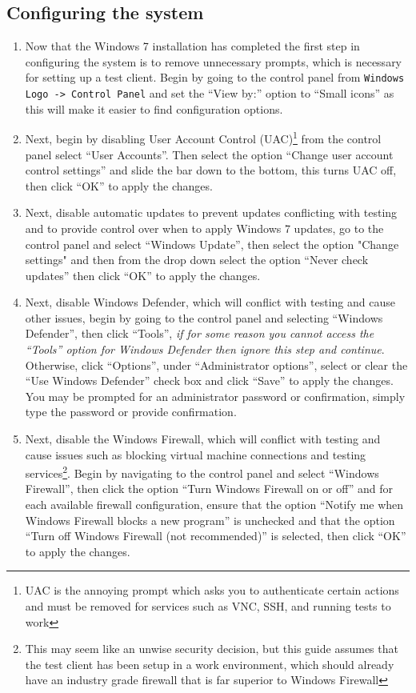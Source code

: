 \newpage
\subsection{Configuring the system}
\label{sec:windows7config}
\begin{enumerate}
\item	Now that the Windows 7 installation has completed the first step in configuring the system is to remove unnecessary prompts,
		which is necessary for setting up a test client. Begin by going to the control panel from \verb|Windows Logo -> Control Panel|
		and set the ``View by:'' option to ``Small icons'' as this will make it easier to find configuration options.
		
\item	Next, begin by disabling User Account Control (UAC)\footnote{UAC is the annoying prompt which asks you to authenticate certain
		actions and must be removed for services such as VNC, SSH, and running tests to work} from the control panel select ``User Accounts''.
		Then select the option ``Change user account control settings'' and slide the bar down to the bottom, this turns UAC off, then click
		``OK'' to apply the changes.
		
\item	Next, disable automatic updates to prevent updates conflicting with testing and to provide control over when to apply Windows 7 updates,
		go to the control panel and select ``Windows Update'', then select the option "Change settings" and then from the drop down select the 
		option ``Never check updates'' then click ``OK'' to apply the changes.
		
\item	Next, disable Windows Defender, which will conflict with testing and cause other issues, begin by going to the control panel and 
		selecting ``Windows Defender'', then click ``Tools'', \emph{if for some reason you cannot access the ``Tools'' option for
		Windows Defender then ignore this step and continue}. Otherwise, click ``Options'', under ``Administrator options'', select or clear 
		the ``Use Windows Defender'' check box and click ``Save'' to apply the changes. You may be prompted for an administrator password or 	
		confirmation, simply type the password or provide confirmation.
		
\item	Next, disable the Windows Firewall, which will conflict with testing and cause issues such as blocking virtual machine connections 
		and testing services\footnote{This may seem like an unwise security decision, but this guide assumes that the test client has been
		setup in a work environment, which should already have an industry grade firewall that is far superior to Windows Firewall}.
		Begin by navigating to the control panel and select ``Windows Firewall'', then click the option ``Turn Windows Firewall on
		or off'' and for each available firewall configuration, ensure that the option ``Notify me when Windows Firewall blocks a new
		program'' is unchecked and that the option ``Turn off Windows Firewall (not recommended)'' is selected, then click ``OK'' to
		apply the changes.
		

\end{enumerate}
